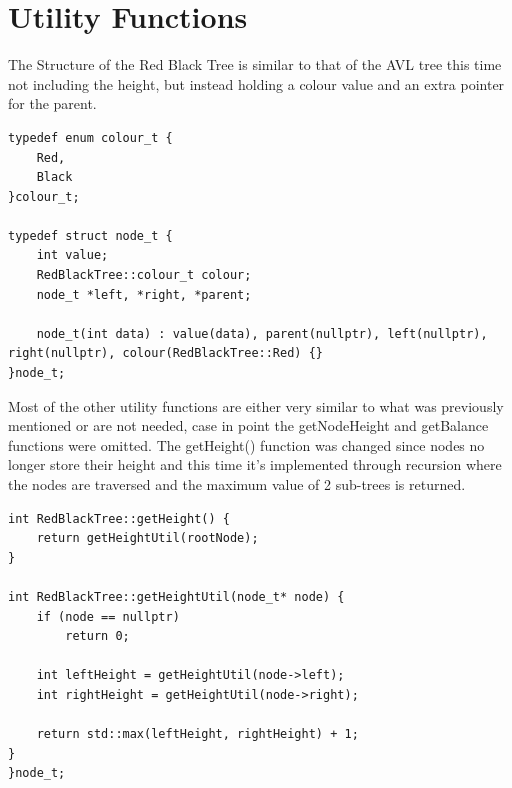 \documentclass[12pt, a4paper]{report}
\begin{document}
\section{Utility Functions}
The Structure of the Red Black Tree is similar to that of the AVL tree this time not including the height, but instead holding a colour value and an extra pointer for the parent.

\begin{verbatim}
typedef enum colour_t { 
    Red,
    Black
}colour_t;

typedef struct node_t {
    int value;
    RedBlackTree::colour_t colour;
    node_t *left, *right, *parent;

    node_t(int data) : value(data), parent(nullptr), left(nullptr), right(nullptr), colour(RedBlackTree::Red) {}
}node_t;
\end{verbatim}

Most of the other utility functions are either very similar to what was previously mentioned or are not needed, case in point the getNodeHeight and getBalance functions were omitted. The getHeight() function was changed since nodes no longer store their height and this time it's implemented through recursion where the nodes are traversed and the maximum value of 2 sub-trees is returned.

\begin{verbatim}
int RedBlackTree::getHeight() {
    return getHeightUtil(rootNode);
}

int RedBlackTree::getHeightUtil(node_t* node) {
    if (node == nullptr)
        return 0;
    
    int leftHeight = getHeightUtil(node->left);
    int rightHeight = getHeightUtil(node->right);
    
    return std::max(leftHeight, rightHeight) + 1;
}
}node_t;
\end{verbatim}
\end{document}
